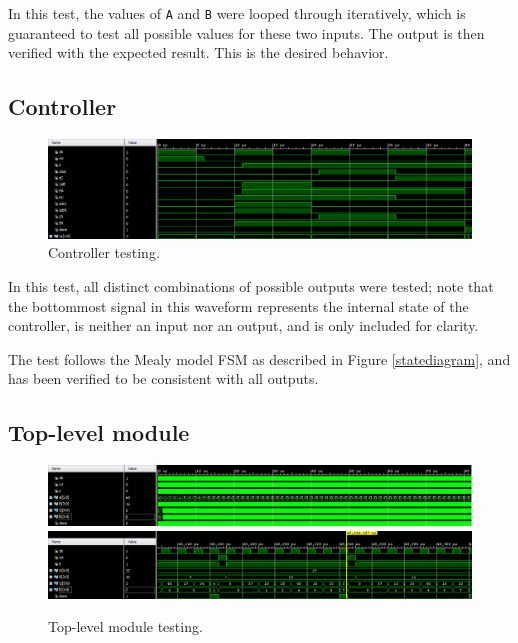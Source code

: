 \documentclass{article}
\renewcommand{\c}[1]{\texttt{#1}}
\begin{document}
In this test, the values of \c{A} and \c{B} were looped through
iteratively, which is guaranteed to test all possible values
for these two inputs. The output is then verified with the
expected result. This is the desired behavior.

\subsection{Controller}
\begin{figure}[H]
    \centering
    \includegraphics[width=\textwidth]{Images/FSM_waveform}
    \caption{Controller testing.}
    \label{test:controller}
\end{figure}

In this test, all distinct combinations of possible outputs
were tested; note that the bottommost signal in this
waveform represents the internal state of the controller,
is neither an input nor an output, and is only included
for clarity.

The test follows the Mealy model FSM as described in Figure
\ref{statediagram}, and has been verified to be consistent
with all outputs.

\subsection{Top-level module}
\begin{figure}[H]
    \centering
    \includegraphics[width=\textwidth]{Images/top_waveform_full}
    \includegraphics[width=\textwidth]{Images/top_waveform_zoom}
    \caption{Top-level module testing.}
    \label{test:top}
\end{figure}
\end{document}
